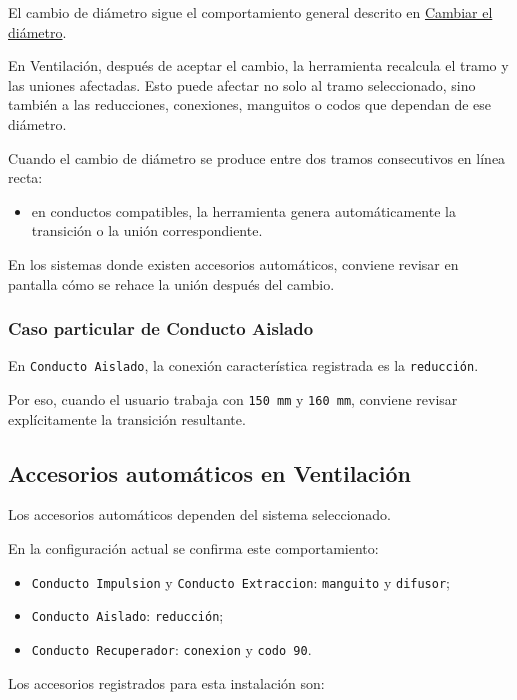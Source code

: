 El cambio de diámetro sigue el comportamiento general descrito en \hyperref[sec:cambiar-diametro]{Cambiar el diámetro}.

En Ventilación, después de aceptar el cambio, la herramienta recalcula el tramo y las uniones afectadas. Esto puede afectar no solo al tramo seleccionado, sino también a las reducciones, conexiones, manguitos o codos que dependan de ese diámetro.

Cuando el cambio de diámetro se produce entre dos tramos consecutivos en línea recta:

\begin{itemize}
\item en conductos compatibles, la herramienta genera automáticamente la transición o la unión correspondiente.
\end{itemize}

En los sistemas donde existen accesorios automáticos, conviene revisar en pantalla cómo se rehace la unión después del cambio.

\subsubsection{Caso particular de Conducto Aislado}

En \texttt{Conducto Aislado}, la conexión característica registrada es la \texttt{reducción}.

Por eso, cuando el usuario trabaja con \texttt{150 mm} y \texttt{160 mm}, conviene revisar explícitamente la transición resultante.

\subsection{Accesorios automáticos en Ventilación}

Los accesorios automáticos dependen del sistema seleccionado.

En la configuración actual se confirma este comportamiento:

\begin{itemize}
\item \texttt{Conducto Impulsion} y \texttt{Conducto Extraccion}: \texttt{manguito} y \texttt{difusor};
\item \texttt{Conducto Aislado}: \texttt{reducción};
\item \texttt{Conducto Recuperador}: \texttt{conexion} y \texttt{codo 90}.
\end{itemize}

Los accesorios registrados para esta instalación son:

